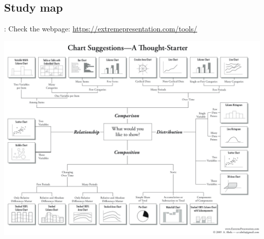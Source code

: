 \subsection{Study map}
\begin{frame}{\secname: \subsecname}
Check the webpage: \url{https://extremepresentation.com/tools/}
\vspace{-10pt}
\begin{center}
	\includegraphics[scale=0.18]{images/chart}
\end{center}

\end{frame}
